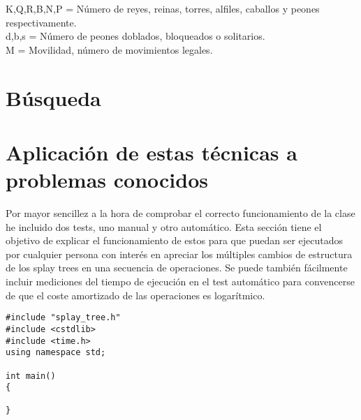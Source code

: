 \documentclass[letterpaper,12pt]{article}
\begin{document}
K,Q,R,B,N,P = Número de reyes, reinas, torres, alfiles, caballos y peones respectivamente. 
\\  d,b,s \hspace{14mm} = Número de peones doblados, bloqueados o solitarios. 
\\ M \hspace{19mm} = Movilidad, número de movimientos legales.


\section{Búsqueda}













\newpage
\appendix
\section{Aplicación de estas técnicas a problemas conocidos}
Por mayor sencillez a la hora de comprobar el correcto funcionamiento de la 
clase he incluido dos tests, uno manual y otro automático. Esta sección tiene
el objetivo de explicar el funcionamiento de estos para que puedan ser 
ejecutados por cualquier persona con interés en apreciar los múltiples cambios
de estructura de los splay trees en una secuencia de operaciones. Se puede
también fácilmente incluir mediciones del tiempo de ejecución en el test 
automático para convencerse de que el coste amortizado de las operaciones es 
logarítmico.


\begin{lstlisting}
#include "splay_tree.h"
#include <cstdlib>
#include <time.h>
using namespace std;

int main()
{

}
\end{lstlisting}

\end{document}
